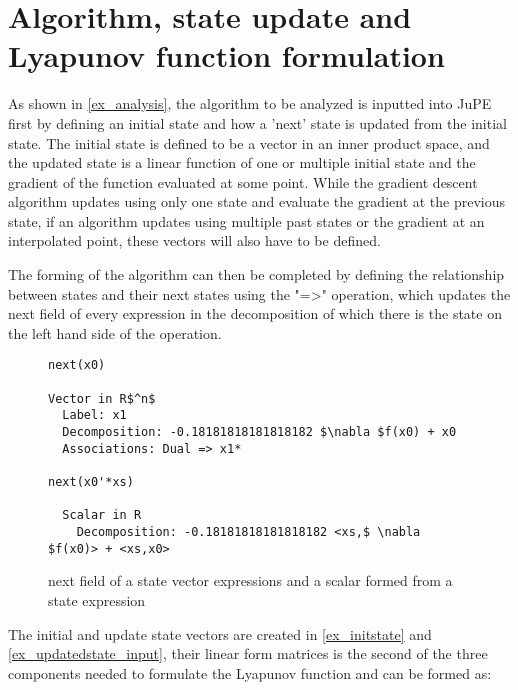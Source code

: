 \section{Algorithm, state update and Lyapunov function formulation}
As shown in \ref{ex_analysis}, the algorithm to be analyzed is inputted into JuPE first by defining an initial state and how a 'next' state is updated from the initial state. The initial state is defined to be a vector in an inner product space, and the updated state is a linear function of one or multiple initial state and the gradient of the function evaluated at some point. While the gradient descent algorithm updates using only one state and evaluate the gradient at the previous state, if an algorithm updates using multiple past states or the gradient at an interpolated point, these vectors will also have to be defined.

The forming of the algorithm can then be completed by defining the relationship between states and their next states using the "=>" operation, which updates the next field of every expression in the decomposition of which there is the state on the left hand side of the operation.

\begin{figure}[h!]
	\begin{lstlisting}[mathescape]
next(x0)

Vector in R$^n$
  Label: x1
  Decomposition: -0.18181818181818182 $\nabla $f(x0) + x0
  Associations: Dual => x1*

next(x0'*xs)

  Scalar in R
    Decomposition: -0.18181818181818182 <xs,$ \nabla $f(x0)> + <xs,x0>
\end{lstlisting}
\caption{next field of a state vector expressions and a scalar formed from a state expression}
\label{ex_next}
\end{figure}

The initial and update state vectors are created in \ref{ex_initstate} and \ref{ex_updatedstate_input}, their linear form matrices is the second of the three components needed to formulate the Lyapunov function and can be formed as:


